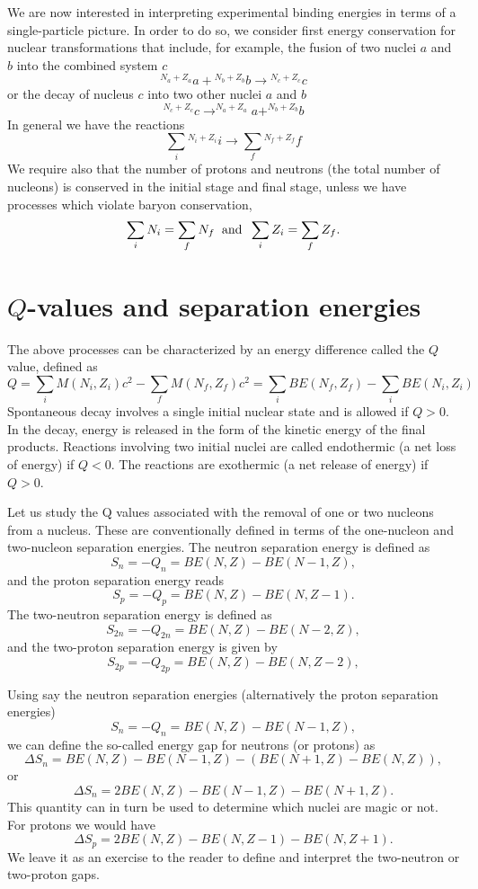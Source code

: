 \documentclass[%
oneside,                 %
final,                   %
10pt]{article}
\begin{document}
We are now interested in interpreting experimental binding energies  in terms of a single-particle picture.
In order to do so, we  consider first energy conservation for nuclear transformations that include, for
example, the fusion of two nuclei $a$ and $b$ into the combined system $c$
\[
{^{N_a+Z_a}}a+ {^{N_b+Z_b}}b\rightarrow {^{N_c+Z_c}}c
\]
or the decay of nucleus $c$ into two other nuclei $a$ and $b$
\[
^{N_c+Z_c}c \rightarrow  ^{N_a+Z_a}a+ ^{N_b+Z_b}b
\]
In general we have the reactions
\[
\sum_i {^{N_i+Z_i}}i \rightarrow  \sum_f {^{N_f+Z_f}}f
\]
We require also that the number of protons and neutrons (the total number of nucleons) is conserved in the initial stage and final stage, unless we have processes which violate baryon conservation, 
\[
\sum_iN_i = \sum_f N_f \hspace{0.2cm}\mathrm{and} \hspace{0.2cm}\sum_iZ_i = \sum_f Z_f.
\]


\section*{$Q$-values and separation energies}

The above processes can be characterized by an energy difference called the $Q$ value, defined as
\[
Q=\sum_i M(N_i, Z_i)c^2-\sum_f M(N_f, Z_f)c^2=\sum_i BE(N_f, Z_f)-\sum_i BE(N_i, Z_i)
\]
Spontaneous decay involves a single initial nuclear state and is allowed if $Q > 0$. In the decay, energy is released in the form of the kinetic energy of the final products. Reactions involving two initial nuclei are called endothermic (a net loss of energy) if $Q < 0$. The reactions are exothermic (a net release of energy) if $Q > 0$.


Let us study the Q values associated with the removal of one or two nucleons from
a nucleus. These are conventionally defined in terms of the one-nucleon and two-nucleon
separation energies. The neutron separation energy is defined as 
\[
S_n= -Q_n= BE(N,Z)-BE(N-1,Z),
\]
and the proton separation energy reads
\[
S_p= -Q_p= BE(N,Z)-BE(N,Z-1).
\]
The two-neutron separation energy is defined as
\[
S_{2n}= -Q_{2n}= BE(N,Z)-BE(N-2,Z),
\]
and  the two-proton separation energy is given by
\[
S_{2p}= -Q_{2p}= BE(N,Z)-BE(N,Z-2),
\]


Using say the neutron separation energies (alternatively the proton separation energies)
\[
S_n= -Q_n= BE(N,Z)-BE(N-1,Z),
\]
we can define the so-called energy gap for neutrons (or protons) as 
\[
\Delta S_n= BE(N,Z)-BE(N-1,Z)-\left(BE(N+1,Z)-BE(N,Z)\right),
\]
or 
\[
\Delta S_n= 2BE(N,Z)-BE(N-1,Z)-BE(N+1,Z).
\]
This quantity can in turn be used to determine which nuclei are magic or not. 
For protons we would have 
\[
\Delta S_p= 2BE(N,Z)-BE(N,Z-1)-BE(N,Z+1).
\]
We leave it as an exercise to the reader to define and interpret the two-neutron or two-proton gaps. 
\end{document}
